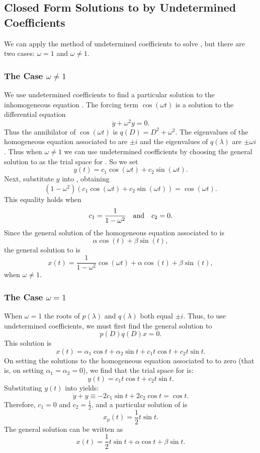 \documentclass{ximera}
\begin{document}
\subsection*{Closed Form Solutions to  by Undetermined 
Coefficients}

We can apply the method of undetermined coefficients to solve , 
but there are two cases: $\omega=1$ and $\omega\neq 1$. 

\subsubsection*{The Case $\omega\not= 1$}  

We use undetermined coefficients to find a particular solution to the 
inhomogeneous equation .  The forcing term $\cos(\omega t)$ is 
a solution to the differential equation 
\begin{equation}  \label{E:omega}
\ddot{y} + \omega^2y = 0.
\end{equation}
Thus the annihilator 
of $\cos(\omega t)$ is $q(D)=D^2+\omega^2$.  The 
eigenvalues of the homogeneous equation associated to  are 
$\pm i$ and the eigenvalues of $q(\lambda)$ are $\pm\omega i$.  Thus when 
$\omega\neq 1$ we can use undetermined coefficients by choosing the general 
solution to  as the trial space 
for .  So we set
\[
y(t) = c_1\cos(\omega t) + c_2\sin(\omega t).
\]
Next, substitute $y$ into , obtaining
\[
(1-\omega ^2)(c_1\cos(\omega t) + c_2\sin(\omega t)) = \cos(\omega t).
\]
This equality holds when 
\[
c_1 = \frac{1}{1-\omega ^2} \quad\mbox{and}\quad c_2=0.
\]
Since the general solution of the 
homogeneous equation associated 
to  is
\[
\alpha \cos(t)+\beta\sin(t),
\]
the general solution to  is
\[
x(t) =\frac{1}{1-\omega ^2}\cos(\omega t) + \alpha\cos(t) + \beta\sin(t),
\]
when $\omega \neq 1$. 

\subsubsection*{The Case $\omega= 1$}

When $\omega= 1$ the roots of $p(\lambda)$ and $q(\lambda)$ both equal 
$\pm i$.  Thus, to use undetermined coefficients, we must first find the 
general solution to 
\[
p(D)q(D)x = 0.
\]
This solution is 
\[
x(t) = \alpha_1\cos t + \alpha_2\sin t + c_1t\cos t + c_2t\sin t.
\]
On setting the solutions to the homogeneous equation associated to 
 to zero (that is, on setting $\alpha_1=\alpha_2=0$), we 
find that the trial space for  is:
\[
y(t) = c_1t\cos t + c_2t\sin t.
\]
Substituting $y(t)$ into  yields:
\[
\ddot{y} + y \equiv -2c_1\sin t + 2c_2\cos t = \cos t.
\]
Therefore, $c_1=0$ and $c_2=\frac{1}{2}$, and a particular solution of 
 is 
\[
x_p(t) = \frac{1}{2}t\sin t.
\]
The general solution can be written as
\[
x(t) = \frac{1}{2}t\sin t+\alpha\cos t+\beta\sin t.
\]
\end{document}
